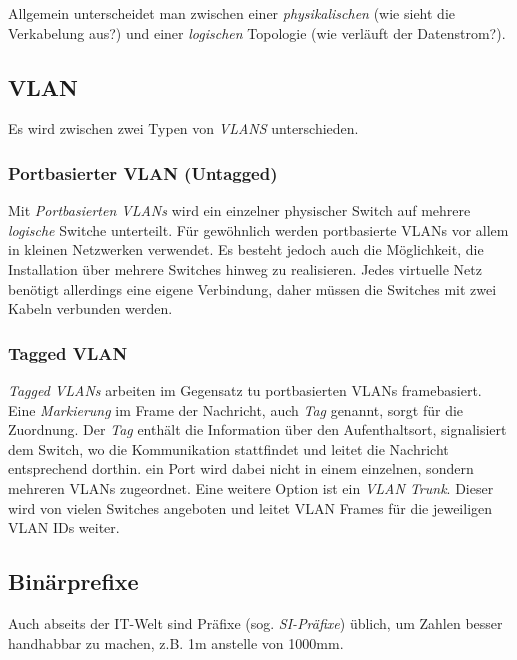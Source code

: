 \documentclass[a4paper, 12pt]{report}
\begin{document}
Allgemein unterscheidet man zwischen einer \emph{physikalischen} (wie sieht die
Verkabelung aus?) und einer \emph{logischen} Topologie (wie verläuft der
Datenstrom?).

\subsection{VLAN}

Es wird zwischen zwei Typen von \emph{VLANS} unterschieden.


\subsubsection{Portbasierter VLAN (Untagged)}

Mit \emph{Portbasierten VLANs} wird ein einzelner physischer Switch auf mehrere
\emph{logische} Switche unterteilt. Für gewöhnlich werden portbasierte VLANs vor
allem in kleinen Netzwerken verwendet. Es besteht jedoch auch die Möglichkeit,
die Installation über mehrere Switches hinweg zu realisieren. Jedes virtuelle
Netz benötigt allerdings eine eigene Verbindung, daher müssen die Switches mit
zwei Kabeln verbunden werden.

\newpage
\subsubsection{Tagged VLAN}
\emph{Tagged VLANs} arbeiten im Gegensatz tu portbasierten VLANs framebasiert.
Eine \emph{Markierung} im Frame der Nachricht, auch \emph{Tag} genannt, sorgt
für die Zuordnung. Der \emph{Tag} enthält die Information über den
Aufenthaltsort, signalisiert dem Switch, wo die Kommunikation stattfindet und
leitet die Nachricht entsprechend dorthin. ein Port wird dabei nicht in einem
einzelnen, sondern mehreren VLANs zugeordnet. Eine weitere Option ist ein
\emph{VLAN Trunk}. Dieser wird von vielen Switches angeboten und leitet VLAN
Frames für die jeweiligen VLAN IDs weiter.

\subsection{Binärprefixe}

Auch abseits der IT-Welt sind Präfixe (sog. \emph{SI-Präfixe}) üblich, um Zahlen
besser handhabbar zu machen, z.B. 1m anstelle von 1000mm. \\
\end{document}
